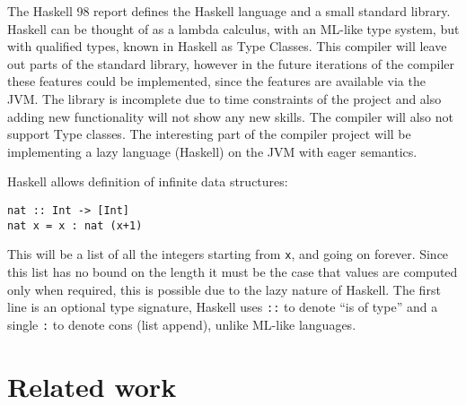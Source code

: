\documentclass[float=false, crop=false]{standalone}
\begin{document}
The Haskell 98\cite{haskell98-spec} report defines the Haskell language 
and a small standard library.
Haskell can be thought of as a lambda calculus, with an ML-like type system,
but with qualified types\cite{qualified-types}, known in 
Haskell as Type Classes. This compiler will
leave out parts of the standard library, however in the future 
iterations of the compiler these 
features could be implemented, since the features are available via the JVM.
The library is incomplete due to time constraints of the project and
also adding new functionality will not show any new skills.
The compiler will also not support Type classes. The interesting
part of the compiler project will be implementing a lazy language (Haskell)
on the JVM with eager semantics.

Haskell allows definition of infinite data structures:

\begin{lstlisting}
nat :: Int -> [Int]
nat x = x : nat (x+1)
\end{lstlisting}

This will be a list of all the integers starting from \texttt{x}, 
and going on forever. Since this list has no 
bound on the length it must be the case that values are computed
only when required, this is possible due to the lazy nature
of Haskell. The first line is an optional type signature, Haskell
uses \verb|::| to denote ``is of type'' and a single \verb|:| to denote cons (list
append), unlike ML-like languages.




  

\section{Related work}
\end{document}
